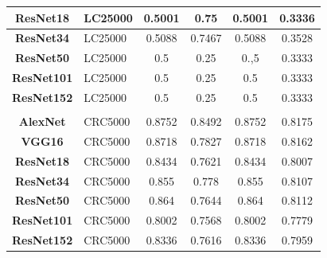 \begin{table}[t!]
\begin{tabular}{|c|l|c|c|c|c|}
\textbf{ResNet18}      & LC25000                               & 0.5001                & 0.75                  & 0.5001                & 0.3336                \\ \hline
\textbf{ResNet34}      & LC25000                               & 0.5088                & 0.7467                & 0.5088                & 0.3528                \\ \hline
\textbf{ResNet50}      & LC25000                               & 0.5                   & 0.25                  & 0.,5                  & 0.3333                \\ \hline
\textbf{ResNet101}     & LC25000                               & 0.5                   & 0.25                  & 0.5                   & 0.3333                \\ \hline
\textbf{ResNet152}     & LC25000                               & 0.5                   & 0.25                  & 0.5                   & 0.3333                \\ \hline
\multicolumn{1}{|l|}{} &                                       & \multicolumn{1}{l|}{} & \multicolumn{1}{l|}{} & \multicolumn{1}{l|}{} & \multicolumn{1}{l|}{} \\ \hline
\textbf{AlexNet}       & CRC5000                               & 0.8752                & 0.8492                & 0.8752                & 0.8175                \\ \hline
\textbf{VGG16}         & CRC5000                               & 0.8718                & 0.7827                & 0.8718                & 0.8162                \\ \hline
\textbf{ResNet18}      & CRC5000                               & 0.8434                & 0.7621                & 0.8434                & 0.8007                \\ \hline
\textbf{ResNet34}      & CRC5000                               & 0.855                 & 0.778                 & 0.855                 & 0.8107                \\ \hline
\textbf{ResNet50}      & CRC5000                               & 0.864                 & 0.7644                & 0.864                 & 0.8112                \\ \hline
\textbf{ResNet101}     & CRC5000                               & 0.8002                & 0.7568                & 0.8002                & 0.7779                \\ \hline
\textbf{ResNet152}     & CRC5000                               & 0.8336                & 0.7616                & 0.8336                & 0.7959                \\ \hline
\end{tabular}

\end{table}



